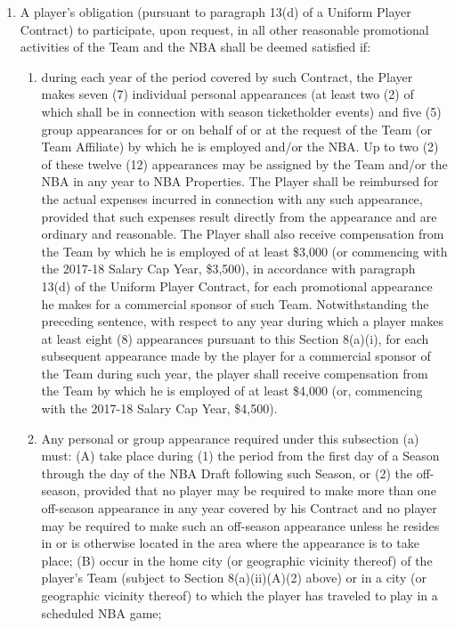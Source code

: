 \documentclass[
]{book}
\providecommand{\tightlist}{%
  \setlength{\itemsep}{0pt}\setlength{\parskip}{0pt}}
\begin{document}
\begin{enumerate}
\def\labelenumi{(\alph{enumi})}
\tightlist
\item
  A player's obligation (pursuant to paragraph 13(d) of a Uniform Player Contract) to participate, upon request, in all other reasonable promotional activities of the Team and the NBA shall be deemed satisfied if:

  \begin{enumerate}
  \def\labelenumii{(\roman{enumii})}
  \tightlist
  \item
    during each year of the period covered by such Contract, the Player makes seven (7) individual personal appearances (at least two (2) of which shall be in connection with season ticketholder events) and five (5) group appearances for or on behalf of or at the request of the Team (or Team Affiliate) by which he is employed and/or the NBA. Up to two (2) of these twelve (12) appearances may be assigned by the Team and/or the NBA in any year to NBA Properties. The Player shall be reimbursed for the actual expenses incurred in connection with any such appearance, provided that such expenses result directly from the appearance and are ordinary and reasonable. The Player shall also receive compensation from the Team by which he is employed of at least \$3,000 (or commencing with the 2017-18 Salary Cap Year, \$3,500), in accordance with paragraph 13(d) of the Uniform Player Contract, for each promotional appearance he makes for a commercial sponsor of such Team. Notwithstanding the preceding sentence, with respect to any year during which a player makes at least eight (8) appearances pursuant to this Section 8(a)(i), for each subsequent appearance made by the player for a commercial sponsor of the Team during such year, the player shall receive compensation from the Team by which he is employed of at least \$4,000 (or, commencing with the 2017-18 Salary Cap Year, \$4,500).
  \item
    Any personal or group appearance required under this subsection (a) must:
    (A) take place during (1) the period from the first day of a Season through the day of the NBA Draft following such Season, or (2) the off-season, provided that no player may be required to make more than one off-season appearance in any year covered by his Contract and no player may be required to make such an off-season appearance unless he resides in or is otherwise located in the area where the appearance is to take place;
    (B) occur in the home city (or geographic vicinity thereof) of the player's Team (subject to Section 8(a)(ii)(A)(2) above) or in a city (or geographic vicinity thereof) to which the player has traveled to play in a scheduled NBA game;

\end{enumerate}
\end{enumerate}
\end{document}
